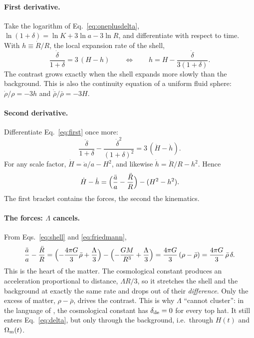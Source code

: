 \documentclass[11pt,a4paper]{article}
\begin{document}
\paragraph{First derivative.} Take the logarithm of
Eq.~\eqref{eq:oneplusdelta}, $\ln(1+\delta)=\ln K+3\ln a-3\ln R$, and
differentiate with respect to time. With $h\equiv\dot R/R$, the local
expansion rate of the shell,
\begin{equation}
  \frac{\dot\delta}{1+\delta}=3\,(H-h)
  \qquad\Longleftrightarrow\qquad
  h=H-\frac{\dot\delta}{3(1+\delta)} .
  \label{eq:first}
\end{equation}
The contrast grows exactly when the shell expands more slowly than the
background. This is also the continuity equation of a uniform fluid
sphere: $\dot\rho/\rho=-3h$ and $\dot{\bar\rho}/\bar\rho=-3H$.

\paragraph{Second derivative.} Differentiate Eq.~\eqref{eq:first} once
more:
\begin{equation}
  \frac{\ddot\delta}{1+\delta}-\frac{\dot\delta^{2}}{(1+\delta)^{2}}
  =3\,(\dot H-\dot h).
  \label{eq:second}
\end{equation}
For any scale factor, $\dot H=\ddot a/a-H^{2}$, and likewise
$\dot h=\ddot R/R-h^{2}$. Hence
\begin{equation}
  \dot H-\dot h=\Bigl(\frac{\ddot a}{a}-\frac{\ddot R}{R}\Bigr)-(H^{2}-h^{2}).
  \label{eq:split}
\end{equation}
The first bracket contains the forces, the second the kinematics.

\paragraph{The forces: $\Lambda$ cancels.} From Eqs.~\eqref{eq:shell}
and \eqref{eq:friedmann},
\begin{equation}
  \frac{\ddot a}{a}-\frac{\ddot R}{R}
  =\Bigl(-\frac{4\pi G}{3}\bar\rho+\frac{\Lambda}{3}\Bigr)
   -\Bigl(-\frac{GM}{R^{3}}+\frac{\Lambda}{3}\Bigr)
  =\frac{4\pi G}{3}\,(\rho-\bar\rho)
  =\frac{4\pi G}{3}\,\bar\rho\,\delta .
  \label{eq:forces}
\end{equation}
This is the heart of the matter. The cosmological constant produces an
acceleration proportional to distance, $\Lambda R/3$, so it stretches the
shell and the background at exactly the same rate and drops out of their
\emph{difference}. Only the excess of matter, $\rho-\bar\rho$, drives the
contrast. This is why $\Lambda$ ``cannot cluster'': in the language of
\citet{Herrera2019}, the cosmological constant has $\delta_{\rm de}=0$
for every top hat. It still enters Eq.~\eqref{eq:delta}, but only through
the background, i.e.\ through $H(t)$ and $\Omega_{\rm m}(t)$.
\end{document}

